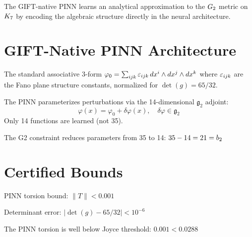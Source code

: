 The GIFT-native PINN learns an analytical approximation to the $G_2$ metric
on $K_7$ by encoding the algebraic structure directly in the neural architecture.

\section{GIFT-Native PINN Architecture}

\begin{definition}\label{def:phi0_standard}
    \leanok
    The standard associative 3-form $\varphi_0 = \sum_{ijk} \varepsilon_{ijk}\, dx^i \wedge dx^j \wedge dx^k$
    where $\varepsilon_{ijk}$ are the Fano plane structure constants, normalized for $\det(g) = 65/32$.
\end{definition}

\begin{definition}\label{def:delta_phi}
    The PINN parameterizes perturbations via the 14-dimensional $\mathfrak{g}_2$ adjoint:
    \[
        \varphi(x) = \varphi_0 + \delta\varphi(x), \quad \delta\varphi \in \mathfrak{g}_2
    \]
    Only 14 functions are learned (not 35).
\end{definition}

\begin{theorem}\label{thm:dim_reduction}
    The G2 constraint reduces parameters from 35 to 14:
    $35 - 14 = 21 = b_2$
\end{theorem}

\section{Certified Bounds}

\begin{definition}\label{def:torsion_bound}
    PINN torsion bound: $\|T\| < 0.001$
\end{definition}

\begin{definition}\label{def:det_error}
    Determinant error: $|\det(g) - 65/32| < 10^{-6}$
\end{definition}

\begin{theorem}\label{thm:joyce_satisfied}
    The PINN torsion is well below Joyce threshold: $0.001 < 0.0288$
\end{theorem}

